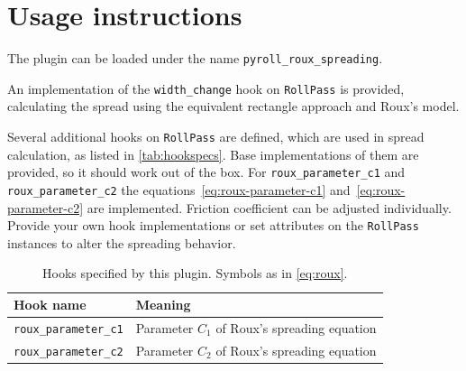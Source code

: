 \documentclass[11pt]{PyRollDocs}
\begin{document}
    \section{Usage instructions}\label{sec:usage-instructions}

    The plugin can be loaded under the name \texttt{pyroll\_roux\_spreading}.

    An implementation of the \lstinline{width_change} hook on \lstinline{RollPass} is provided,
    calculating the spread using the equivalent rectangle approach and Roux's model.

    Several additional hooks on \lstinline{RollPass} are defined, which are used in spread calculation, as listed in \autoref{tab:hookspecs}.
    Base implementations of them are provided, so it should work out of the box.
    For \lstinline{roux_parameter_c1} and \lstinline{roux_parameter_c2} the equations~\ref{eq:roux-parameter-c1} and~\ref{eq:roux-parameter-c2} are implemented.
    Friction coefficient can be adjusted individually.
    Provide your own hook implementations or set attributes on the \lstinline{RollPass} instances to alter the spreading behavior.

    \begin{table}
        \centering
        \caption{Hooks specified by this plugin. Symbols as in \autoref{eq:roux}.}
        \label{tab:hookspecs}
        \begin{tabular}{ll}
            \toprule
            Hook name                     & Meaning                                      \\
            \midrule
            \texttt{roux\_parameter\_c1}   & Parameter $C_1$ of Roux's spreading equation \\
            \texttt{roux\_parameter\_c2}   & Parameter $C_2$ of Roux's spreading equation \\
            \bottomrule
        \end{tabular}
    \end{table}

    \printbibliography
\end{document}
